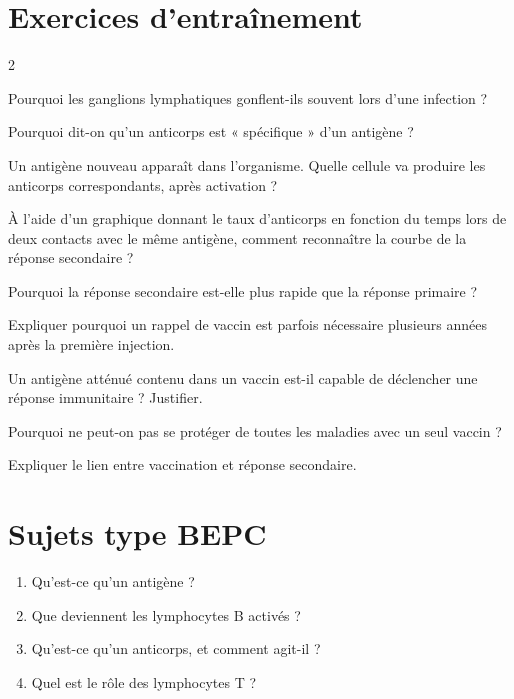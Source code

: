 \section{Exercices d'entraînement}
\begin{multicols}{2}

\exo{} Pourquoi les ganglions lymphatiques gonflent-ils souvent lors d'une
infection ?

\exo{} Pourquoi dit-on qu'un anticorps est « spécifique » d'un antigène ?

\exo{} Un antigène nouveau apparaît dans l'organisme. Quelle cellule va produire
les anticorps correspondants, après activation ?

\exo{} À l'aide d'un graphique donnant le taux d'anticorps en fonction du temps
lors de deux contacts avec le même antigène, comment reconnaître la courbe de la réponse
secondaire ?

\exo{} Pourquoi la réponse secondaire est-elle plus rapide que la réponse
primaire ?

\exo{} Expliquer pourquoi un rappel de vaccin est parfois nécessaire plusieurs
années après la première injection.

\exo{} Un antigène atténué contenu dans un vaccin est-il capable de déclencher
une réponse immunitaire ? Justifier.

\exo{} Pourquoi ne peut-on pas se protéger de toutes les maladies avec un seul
vaccin ?

\exo{} Expliquer le lien entre vaccination et réponse secondaire.

\end{multicols}

\section{Sujets type BEPC}

\begin{enumerate}[label=\arabic*)]
\item Qu'est-ce qu'un antigène ?
\item Que deviennent les lymphocytes B activés ?
\item Qu'est-ce qu'un anticorps, et comment agit-il ?
\item Quel est le rôle des lymphocytes T ?
\end{enumerate}

